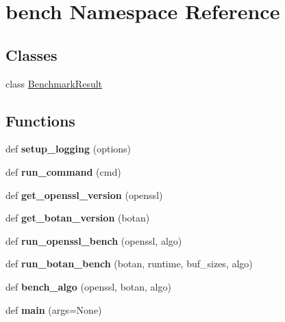 \hypertarget{namespacebench}{}\section{bench Namespace Reference}
\label{namespacebench}
\subsection*{Classes}
\begin{DoxyCompactItemize}
\item 
class \mbox{\hyperlink{classbench_1_1_benchmark_result}{Benchmark\+Result}}
\end{DoxyCompactItemize}
\subsection*{Functions}
\begin{DoxyCompactItemize}
\item 
\mbox{\label{namespacebench_a8ad2e3ac0b543c06e5d8a30f1796af91}} 
def {\bfseries setup\+\_\+logging} (options)
\item 
\mbox{\label{namespacebench_a6a3dc9c06ce63ff4e7bb7813e2cf1363}} 
def {\bfseries run\+\_\+command} (cmd)
\item 
\mbox{\label{namespacebench_a2bc5f820d4ee839a687494e28144d9df}} 
def {\bfseries get\+\_\+openssl\+\_\+version} (openssl)
\item 
\mbox{\label{namespacebench_a778e536e0f6cf786d3aa750724fac384}} 
def {\bfseries get\+\_\+botan\+\_\+version} (botan)
\item 
\mbox{\label{namespacebench_a8f97c3e09f3c7c23b4aa5e61963da20c}} 
def {\bfseries run\+\_\+openssl\+\_\+bench} (openssl, algo)
\item 
\mbox{\label{namespacebench_a27586eb0e50ca2f0c39ca401e0ba512e}} 
def {\bfseries run\+\_\+botan\+\_\+bench} (botan, runtime, buf\+\_\+sizes, algo)
\item 
\mbox{\label{namespacebench_a2e8d06281ccb4fdac4602f86137fdb3f}} 
def {\bfseries bench\+\_\+algo} (openssl, botan, algo)
\item 
\mbox{\label{namespacebench_a68de73e69f4a9ff32ccd2881bdd10b41}} 
def {\bfseries main} (args=None)
\end{DoxyCompactItemize}
